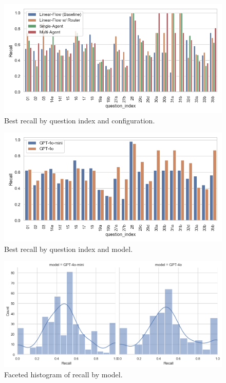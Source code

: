                 \begin{figure}[H]
                    \centering
                    \includegraphics[scale=0.75]{images_exp2/recall/best_recall_by_question_index_and_configuration.png}
                    \caption{Best recall by question index and configuration.}
                    \label{fig:best_recall_by_question_index_and_configuration}
                \end{figure}

                \begin{figure}[H]
                    \centering
                    \includegraphics[scale=0.75]{images_exp2/recall/best_recall_by_question_index_and_model.png}
                    \caption{Best recall by question index and model.}
                    \label{fig:best_recall_by_question_index_and_model}
                \end{figure}


                \begin{figure}[H]
                    \centering
                    \includegraphics[width=0.75\linewidth]{images_exp2/recall/facet_hist_recall_by_model.png}
                    \caption{Faceted histogram of recall by model.}
                    \label{fig:facet_hist_recall_by_model}
                \end{figure}

